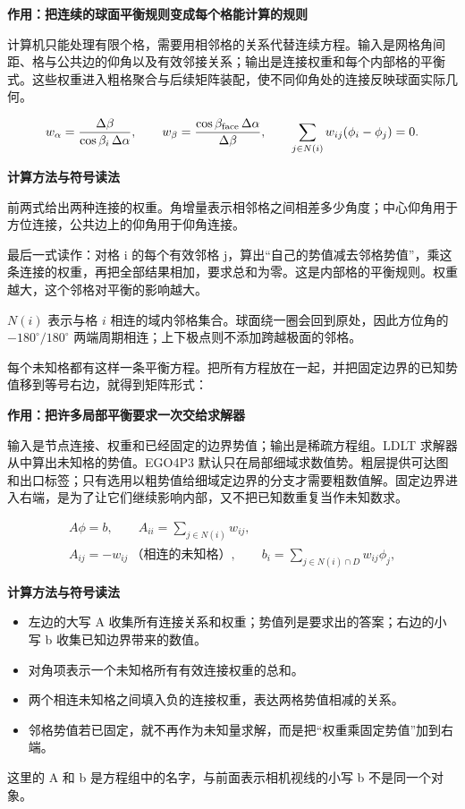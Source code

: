 \documentclass[12pt,a4paper]{article}
\numberwithin{equation}{topic}
\begin{document}
\noindent\textbf{作用：把连续的球面平衡规则变成每个格能计算的规则}\par\nobreak
计算机只能处理有限个格，需要用相邻格的关系代替连续方程。输入是网格角间距、格与公共边的仰角以及有效邻接关系；输出是连接权重和每个内部格的平衡式。这些权重进入粗格聚合与后续矩阵装配，使不同仰角处的连接反映球面实际几何。

\begin{equation}
\label{eq:flux}
w_\alpha=\frac{\Delta\beta}{\cos\beta_i\,\Delta\alpha},
\qquad
w_\beta=\frac{\cos\beta_{\rm face}\,\Delta\alpha}{\Delta\beta},
\qquad
\sum_{j\in N(i)}w_{ij}(\phi_i-\phi_j)=0.
\end{equation}

\noindent\textbf{计算方法与符号读法}\par\nobreak
前两式给出两种连接的权重。角增量表示相邻格之间相差多少角度；中心仰角用于方位连接，公共边上的仰角用于仰角连接。

最后一式读作：对格 i 的每个有效邻格 j，算出“自己的势值减去邻格势值”，乘这条连接的权重，再把全部结果相加，要求总和为零。这是内部格的平衡规则。权重越大，这个邻格对平衡的影响越大。


\(N(i)\) 表示与格 \(i\) 相连的域内邻格集合。球面绕一圈会回到原处，因此方位角的 \(-180^\circ/180^\circ\) 两端周期相连；上下极点则不添加跨越极面的邻格。

每个未知格都有这样一条平衡方程。把所有方程放在一起，并把固定边界的已知势值移到等号右边，就得到矩阵形式：

\noindent\textbf{作用：把许多局部平衡要求一次交给求解器}\par\nobreak
输入是节点连接、权重和已经固定的边界势值；输出是稀疏方程组。LDLT 求解器从中算出未知格的势值。EGO4P3 默认只在局部细域求数值势。粗层提供可达图和出口标签；只有选用以粗势值给细域定边界的分支才需要粗数值解。固定边界进入右端，是为了让它们继续影响内部，又不把已知数重复当作未知数求。

\begin{equation}
\label{eq:matrix}
\begin{gathered}
A\phi=b,\qquad
A_{ii}=\sum_{j\in N(i)}w_{ij},\\
A_{ij}=-w_{ij}\ \text{（相连的未知格）},\qquad
b_i=\sum_{j\in N(i)\cap D}w_{ij}\phi_j,
\end{gathered}
\end{equation}

\noindent\textbf{计算方法与符号读法}\par\nobreak
\begin{itemize}
\item 左边的大写 A 收集所有连接关系和权重；势值列是要求出的答案；右边的小写 b 收集已知边界带来的数值。
\item 对角项表示一个未知格所有有效连接权重的总和。
\item 两个相连未知格之间填入负的连接权重，表达两格势值相减的关系。
\item 邻格势值若已固定，就不再作为未知量求解，而是把“权重乘固定势值”加到右端。
\end{itemize}
这里的 A 和 b 是方程组中的名字，与前面表示相机视线的小写 b 不是同一个对象。
\end{document}
